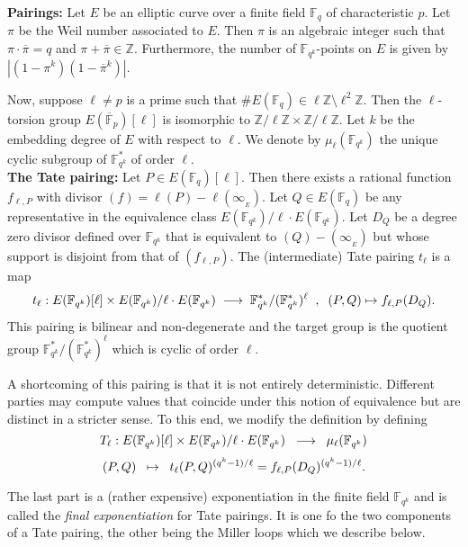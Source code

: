 \documentclass[11pt, lettersize, notitlepage, leqno, footskip=0.6cm]{article}
\newcommand{\bF}{\mathbb F}
\newcommand{\bz}{\mathbb Z}
\newcommand{\bFP}{\ov{\mathbb{F}}_p}
\newcommand{\bFq}{\mathbb{F}_q}
\newcommand{\bFqk}{\mathbb{F}_{q^k}}
\newcommand{\lra}{\longrightarrow}
\newcommand{\ov}{\overline}
\newcommand{\vs}{\vspace{-2mm}}
\newcommand{\noin}{\noindent}
\numberwithin{equation}{section}
\begin{document}
\noin \textbf{Pairings:} Let $E$ be an elliptic curve over a finite field $\bFq$  of characteristic $p$. Let $\pi$ be the Weil number associated to $E$. Then $\pi$ is an algebraic integer such that $\pi\cdot \ov{\pi} = q$ and $\pi+\ov{\pi}\in \bz$. Furthermore, the number of $\bFqk$-points on $E$ is given by $|(1-\pi^k)(1-\ov{\pi}^k)|$.


Now, suppose $\ell\neq p$ is a prime such that $\# E(\bFq)\in \ell\bz\setminus \ell^2\bz$. Then the $\ell$-torsion group $E(\bFP)[\ell]$ is isomorphic to $\bz/\ell\bz \times \bz/\ell\bz$. Let $k$ be the embedding degree of $E$ with respect to $\ell$. We denote by $\mu_{\ell}(\bF _{q^k})$ the unique cyclic subgroup of $\bF _{q^k}^*$ of order $\ell$.\\

\noin \textbf{The Tate pairing:} Let $P\in E(\bFq)[\ell]$. Then there exists a rational function $f_{\ell,P}$ with divisor $(f) = \ell(P) - \ell(\infty_{_E})$. Let $Q\in E(\bFq)$ be any representative in the equivalence class $E(\bF _ {q^k})/\ell \cdot E(\bF _ {q^k})$. Let $D_Q$ be a degree zero divisor defined over $\bF _ {q^k}$ that is equivalent to $(Q)-(\infty_{_E})$ but whose support is disjoint from that of $(f_{\ell,P})$. The (intermediate) Tate pairing $t_{\ell}$ is a map \vs $$t_{\ell}: E(\bF _ {q^k})[\ell]\times E(\bF _ {q^k})/\ell \cdot E(\bF _ {q^k})\;\lra\; \bF _ {q^k}^*/(\bF _ {q^k}^*)^{\ell}\;\;,\;\;(P,Q)\mapsto f_{\ell,P}(D_Q) \vs .$$ This pairing is bilinear and non-degenerate and the target group is the quotient group $\bF _ {q^k}^*/(\bF _ {q^k}^*)^{\ell}$ which is cyclic of order $\ell$. 

A shortcoming of this pairing is that it is not entirely deterministic. Different parties may compute values that coincide under this notion of equivalence   but are distinct in a stricter sense. To this end, we modify the definition by defining \vs $$T_{\ell} : E(\bF _ {q^k})[\ell]\times E(\bF _ {q^k})/\ell \cdot E(\bF _ {q^k})\;\;\lra\;\; \mu_{\ell}(\bF _ {q^k})\vs $$ \vs $$(P,Q)\;\;\mapsto\;\; t_{\ell}(P,Q)^{(q^k-1)/\ell} = f_{\ell, P}(D_Q)^{(q^k-1)/\ell}. \vs $$  

\noin The last part is a (rather expensive) exponentiation in the finite field $\bF _ {q^k}$ and is called the \textit{final exponentiation} for Tate pairings. It is one fo the two components of a Tate pairing, the other being the Miller loops which we describe below. 



    
\bigskip
\end{document}
